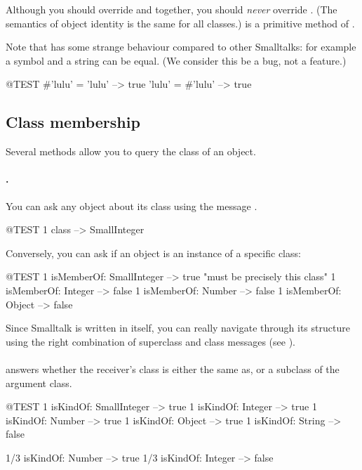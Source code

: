 \documentclass[a4paper,10pt,twoside]{book}
\begin{document}
Although you should override \ct{=} and  together, you should \emph{never} override \ct{==}. (The semantics of object identity is the same for all classes.)  \ct{==} is a primitive method of .

Note that \pharo has some strange behaviour compared to other Smalltalks: for example a symbol and a string can be equal. (We consider this be a bug, not a feature.)

\begin{code}{@TEST}
#'lulu' = 'lulu' --> true
'lulu' = #'lulu' --> true
\end{code}


\subsection{Class membership}
Several methods allow you to query the class of an object. 

\paragraph{.} You can ask any object about its class using the message .
\begin{code}{@TEST}
1 class --> SmallInteger
\end{code}

Conversely, you can ask if an object is an instance of a specific class:
\begin{code}{@TEST}
1 isMemberOf: SmallInteger --> true    "must be precisely this class"
1 isMemberOf: Integer          --> false
1 isMemberOf: Number        --> false
1 isMemberOf: Object           --> false
\end{code}

Since Smalltalk is written in itself, you can really navigate through its structure using the right combination of superclass and class messages (see ). 

\paragraph{}
 answers whether the receiver's class is either the same as, or a subclass of the argument class.

\begin{code}{@TEST}
1 isKindOf: SmallInteger --> true
1 isKindOf: Integer          --> true
1 isKindOf: Number         --> true
1 isKindOf: Object           --> true
1 isKindOf: String            --> false

1/3 isKindOf: Number      --> true
1/3 isKindOf: Integer        --> false
\end{code}
\end{document}
